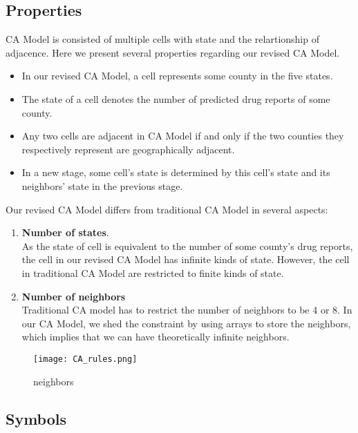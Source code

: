 \documentclass{mcmthesis}
\begin{document}
\subsection{Properties} %

CA Model is consisted of multiple cells with state and the relartionship of adjacence. Here we present several properties regarding our revised CA Model. 

\begin{itemize}
\item In our revised CA Model, a cell represents some county in the five states.
\item The state of a cell denotes the number of predicted drug reports of some county.
\item Any two cells are adjacent in CA Model if and only if the two counties they respectively represent are geographically adjacent.
\item In a new stage, some cell's state is determined by this cell's state and its neighbors' state in the previous stage.
\end{itemize}

Our revised CA Model differs from traditional CA Model in several aspects: 
\begin{enumerate}
\item \textbf{Number of  states}.\\
As the state of cell is equivalent to the number of some county's drug reports, the cell in our revised CA Model has infinite kinds of state. However, the cell in traditional CA Model are restricted to finite kinds of state.
\item \textbf{Number of neighbors}\\
Traditional CA model has to restrict the number of neighbors to be 4 or 8. In our CA Model, we shed the constraint by using arrays to store the neighbors, which implies that we can have theoretically infinite neighbors.
\end{enumerate}

\begin{figure}[h]
\small
\centering
\texttt{[image: CA\_rules.png]}
\caption{neighbors} \label{fig:neighbors}
\end{figure}


\subsection{Symbols}
\end{document}
